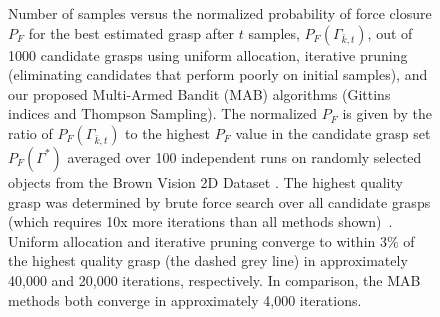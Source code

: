 \documentclass[10pt, conference]{ieeeconf}      %
\begin{document}
\begin{figure}%
    \centering

    \caption{Number of samples versus the normalized probability of force closure $P_F$ for the best estimated grasp 
        after $t$ samples, $P_F(\Gamma_{\bar{k}, t})$, out of 1000 candidate grasps using uniform allocation, iterative pruning (eliminating candidates that perform poorly on initial samples), and our proposed Multi-Armed Bandit (MAB) algorithms (Gittins indices and Thompson Sampling).
    The normalized $P_F$ is given by the ratio of $P_F(\Gamma_{\bar{k}, t})$ to the highest $P_F$ value in the candidate
    grasp set $P_F(\Gamma^*)$ averaged over 100 independent runs on randomly selected objects from the Brown Vision 2D Dataset \cite{brown}.
    The highest quality grasp was determined by brute force search over all candidate grasps (which requires 10x more
    iterations than all methods shown)~\cite{kehoe2012toward}.
    Uniform allocation and iterative pruning converge to within 3$\%$ of the highest quality grasp (the dashed grey line) in approximately 40,000 and 20,000 iterations, respectively. In comparison, the MAB methods both converge in approximately 4,000 iterations. 
%    
	}
    \label{fig:grasp_quality}
\end{figure}
\end{document}
